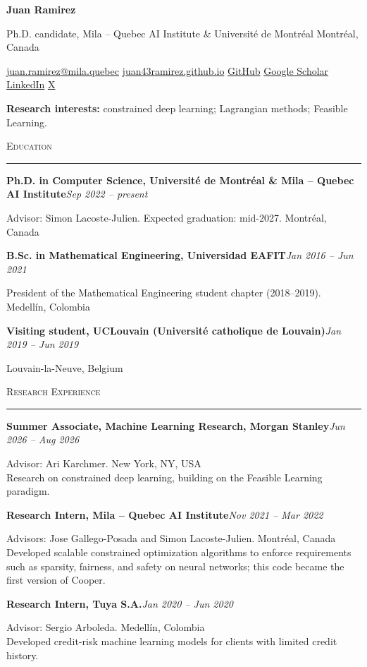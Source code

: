 \documentclass[11pt,letterpaper]{article}
\newcommand{\sep}{\enspace\textcolor{rulegray}{\textbar}\enspace}
\newcommand{\entry}[3]{%
  \par\addvspace{0.45em}%
  {\noindent\textbf{#1}\hfill\textit{#2}\par}%
  \nobreak\addvspace{0.1em}%
  {\noindent #3\par}%
}
\newcommand{\cvsection}[1]{%
  \par\addvspace{1.1em}%
  \Needspace{4\baselineskip}%
  {\noindent\large\scshape #1\par}%
  \nobreak\vspace{-0.55em}%
  {\noindent\color{rulegray}\rule{\textwidth}{0.4pt}\par}%
  \nobreak\addvspace{0.45em}%
}
\begin{document}
{\LARGE\bfseries Juan Ramirez\par}
\vspace{0.3em}
Ph.D. candidate, Mila – Quebec AI Institute \& Université de Montréal \hfill Montréal, Canada\par
{\small
\href{mailto:juan.ramirez@mila.quebec}{juan.ramirez@mila.quebec}\sep
\href{https://juan43ramirez.github.io}{juan43ramirez.github.io}\sep
\href{https://github.com/juan43ramirez}{GitHub}\sep
\href{https://scholar.google.com/citations?user=yop0kRkAAAAJ}{Google Scholar}\sep
\href{https://www.linkedin.com/in/juan-ramirez-11ab2b141}{LinkedIn}\sep
\href{https://x.com/juan43ramirez}{X}\par}
\vspace{0.5em}
\textbf{Research interests:} constrained deep learning; Lagrangian methods; Feasible Learning.\par

\cvsection{Education}

\entry{Ph.D. in Computer Science, Université de Montréal \& Mila – Quebec AI Institute}{Sep 2022 – present}{Advisor: Simon Lacoste-Julien. Expected graduation: mid-2027. \hfill Montréal, Canada}

\entry{B.Sc. in Mathematical Engineering, Universidad EAFIT}{Jan 2016 – Jun 2021}{President of the Mathematical Engineering student chapter (2018–2019). \hfill Medellín, Colombia}

\entry{Visiting student, UCLouvain (Université catholique de Louvain)}{Jan 2019 – Jun 2019}{\hfill Louvain-la-Neuve, Belgium}

\cvsection{Research Experience}

\entry{Summer Associate, Machine Learning Research, Morgan Stanley}{Jun 2026 – Aug 2026}{Advisor: Ari Karchmer. \hfill New York, NY, USA \\
Research on constrained deep learning, building on the Feasible Learning paradigm.}

\entry{Research Intern, Mila – Quebec AI Institute}{Nov 2021 – Mar 2022}{Advisors: Jose Gallego-Posada and Simon Lacoste-Julien. \hfill Montréal, Canada \\
Developed scalable constrained optimization algorithms to enforce requirements such as sparsity, fairness, and safety on neural networks; this code became the first version of Cooper.}

\entry{Research Intern, Tuya S.A.}{Jan 2020 – Jun 2020}{Advisor: Sergio Arboleda. \hfill Medellín, Colombia \\
Developed credit-risk machine learning models for clients with limited credit history.}
\end{document}
